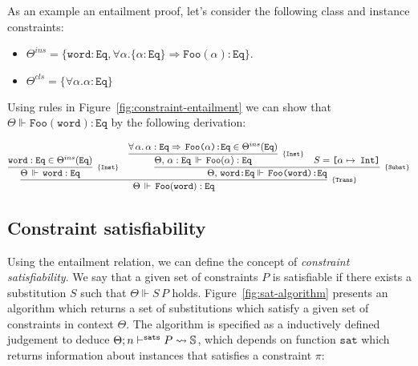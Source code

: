 \documentclass[a4paper, 11pt]{article}
\theoremstyle{definition}
\begin{document}
\begin{Example}
As an example an entailment proof, let's consider the following class 
and instance constraints:
\begin{itemize}
  \item $\Theta^{ins} = \{\mathtt{word}:\mathtt{Eq}, \forall \alpha. \{\alpha:\mathtt{Eq}\}\Rightarrow \mathtt{Foo}(\alpha):\mathtt{Eq}\}$.
  \item $\Theta^{cls} =\{\forall \alpha . \alpha : \mathtt{Eq}\}$
\end{itemize}

Using rules in Figure~\ref{fig:constraint-entailment} we can show 
that $\Theta\Vdash \mathtt{Foo}(\mathtt{word}) : \mathtt{Eq}$
by the following derivation:

\[
  \infer[_{\{\mathtt{Trans}\}}]
		{\Theta\,\Vdash\,\mathtt{Foo(word):Eq}}
		{
      \infer[_{\{\mathtt{Inst}\}}]
				{\Theta\,\Vdash\,\mathtt{word : Eq}}
				{\mathtt{word : Eq}\in\Theta^{ins}(\texttt{Eq})}
			&
      \infer[_{\{\mathtt{Subst}\}}]
				{\Theta,\,\texttt{word:Eq}\Vdash\,\texttt{Foo(word):Eq}}
				{
          \infer[_{\{\mathtt{Inst}\}}]
            {\Theta,\,\alpha : \texttt{Eq}\,\Vdash\,\mathtt{Foo}(\alpha) : \texttt{Eq}}
						{\forall\,\alpha.\,\alpha : \texttt{Eq}\Rightarrow\,\texttt{Foo($\alpha$):Eq}\in
							\Theta^{ins}(\texttt{Eq})}
					& S = \texttt{[$\alpha\mapsto$ Int]}
				}
		}
\]

\end{Example}


\subsection{Constraint satisfiability}

Using the entailment relation, we can define the concept of 
\emph{constraint satisfiability}. We say that a given set 
of constraints $P$ is satisfiable if there exists a substitution 
$S$ such that $\Theta \Vdash S\,P$ holds. Figure~\ref{fig:sat-algorithm} 
presents an algorithm which returns a set of substitutions 
which satisfy a given set of constraints in context $\Theta$. 
The algorithm is specified as a inductively defined judgement 
to deduce $\sats{P}{\mathbb{S}}{n}$, which 
depends on function $\mathtt{sat}$ which returns information 
about instances that satisfies a constraint $\pi$:
\end{document}
